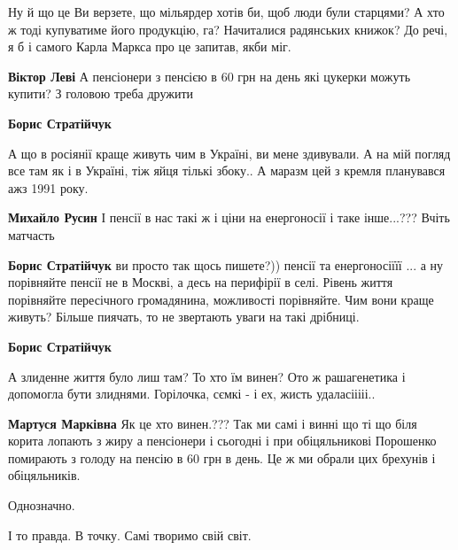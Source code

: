 \begin{itemize}
\begin{itemize}

Ну й що це Ви верзете, що мільярдер хотів би, щоб люди були старцями? А хто ж
тоді купуватиме його продукцію, га? Начиталися радянських книжок? До речі, я б
і самого Карла Маркса про це запитав, якби міг.

\begin{itemize} %
\textbf{Віктор Леві} А пенсіонери з пенсією в 60 грн на день які цукерки можуть купити? З головою треба дружити
\end{itemize} %

\textbf{Борис Стратійчук} 

А що в росіянії краще живуть чим в Україні, ви мене здивували. А на мій погляд
все там як і в Україні, тіж яйця тількі збоку.. А маразм цей з кремля
планувався ажз 1991 року.

\begin{itemize} %
\textbf{Михайло Русин} І пенсії в нас такі ж і ціни на енергоносії і таке інше...??? Вчіть матчасть

\textbf{Борис Стратійчук} ви просто так щось пишете?)) пенсії та енергоносіїїї ... а ну порівняйте пенсії не в Москві, а десь на перифірії в селі. Рівень життя порівняйте пересічного громадянина, можливості порівняйте. Чим вони краще живуть? Більше пиячать, то не звертають уваги на такі дрібниці.
\end{itemize} %

\textbf{Борис Стратійчук} 

А злиденне життя було лиш там? То хто їм винен? Ото ж рашагенетика і допомогла
бути злиднями. Горілочка, сємкі - і ех, жисть удаласііііі..

\begin{itemize} %
\textbf{Мартуся Марківна} Як це хто винен.??? Так ми самі і винні що ті що біля корита лопають з жиру а пенсіонери і сьогодні і при обіцяльникові Порошенко помирають з голоду на пенсію в 60 грн в день. Це ж ми обрали цих брехунів і обіцяльників.
\end{itemize} %

\end{itemize} %

Однозначно.

І то правда. В точку. Самі творимо свій світ.



\end{itemize}
